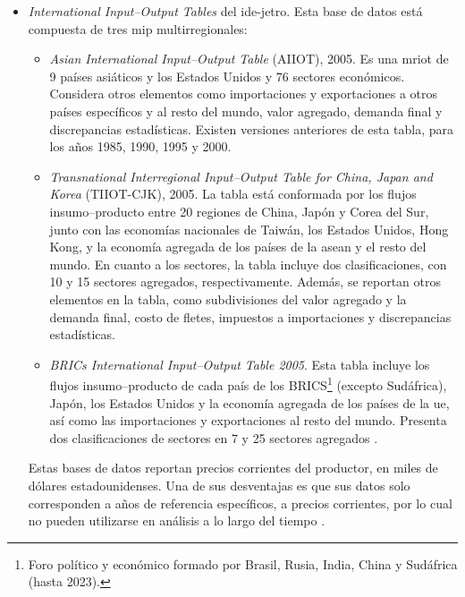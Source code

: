 \begin{itemize}
 \item \textit{International Input--Output Tables} del \gls{ide-jetro}. Esta base de datos está compuesta de tres \gls{mip} multirregionales:
 \begin{itemize}
  \item \textit{Asian International Input--Output Table} (AIIOT), 2005. Es una \gls{mriot} de 9 países asiáticos y los Estados Unidos y 76 sectores económicos. Considera otros elementos como importaciones y exportaciones a otros países específicos y al resto del mundo, valor agregado, demanda final y discrepancias estadísticas. Existen versiones anteriores de esta tabla, para los años 1985, 1990, 1995 y 2000.
  \item \textit{Transnational Interregional Input--Output Table for China, Japan and Korea} (TIIOT-CJK), 2005. La tabla está conformada por los flujos insumo--producto entre 20 regiones de China, Japón y Corea del Sur, junto con las economías nacionales de Taiwán, los Estados Unidos, Hong Kong, y la economía agregada de los países de la \acrfull{asean} y el resto del mundo. En cuanto a los sectores, la tabla incluye dos clasificaciones, con 10 y 15 sectores agregados, respectivamente. Además, se reportan otros elementos en la tabla, como subdivisiones del valor agregado y la demanda final, costo de fletes, impuestos a importaciones y discrepancias estadísticas.
  \item \textit{BRICs International Input--Output Table 2005}. Esta tabla incluye los flujos insumo--producto de cada país de los BRICS\footnote{Foro político y económico formado por Brasil, Rusia, India, China y Sudáfrica (hasta 2023).} (excepto Sudáfrica), Japón, los Estados Unidos y la economía agregada de los países de la \acrlong{ue}, así como las importaciones y exportaciones al resto del mundo. Presenta dos clasificaciones de sectores en 7 y 25 sectores agregados \parencite{Meng2013, IDE-JETRO}.
 \end{itemize}
 Estas bases de datos reportan precios corrientes del productor, en miles de dólares estadounidenses. Una de sus desventajas es que sus datos solo corresponden a años de referencia específicos, a precios corrientes, por lo cual no pueden utilizarse en análisis a lo largo del tiempo \parencite[p.~578]{Timmer2015}.
 

\end{itemize}
